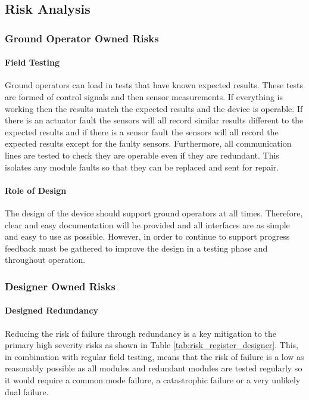 \subsection{Risk Analysis}\label{sub_section:tgt_risk}
\subsubsection{Ground Operator Owned Risks}\label{sub_sub_section:tgt_ground_operator_risk} 

\paragraph{Field Testing}
Ground operators can load in tests that have known expected results. These tests are formed of control signals and then sensor measurements. If everything is working then the results match the expected results and the device is operable. If there is an actuator fault the sensors will all record similar results different to the expected results and if there is a sensor fault the sensors will all record the expected results except for the faulty sensors. Furthermore, all communication lines are tested to check they are operable even if they are redundant. This isolates any module faults so that they can be replaced and sent for repair.
\paragraph{Role of Design}
The design of the device should support ground operators at all times. Therefore, clear and easy documentation will be provided and all interfaces are as simple and easy to use as possible. However, in order to continue to support progress feedback must be gathered to improve the design in a testing phase and throughout operation.

\subsubsection{Designer Owned Risks}\label{sub_sub_section:tgt_design_risk}
 
\paragraph{Designed Redundancy}
Reducing the risk of failure through redundancy is a key mitigation to the primary high severity risks as shown in Table \ref{tab:risk_register_designer}. This, in combination with regular field testing, means that the risk of failure is a low as reasonably possible as all modules and redundant modules are tested regularly so it would require a common mode failure, a catastrophic failure or a very unlikely dual failure.
